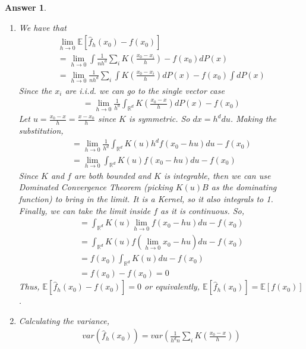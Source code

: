 \documentclass[12pt]{article}
\theoremstyle{colon}
\newtheorem*{answer}{Answer}
\begin{document}
\begin{answer}
  \leavevmode
  \begin{enumerate}[label=\arabic*)]
    \item We have that
      \begin{gather*}
        \lim_{h \rightarrow 0} \mathbb{E}[\widehat{f}_h(x_0) - f(x_0)] \\
        = \lim_{h \rightarrow 0} \int \frac{1}{n h^d} \sum_i K \left( \frac{x_0 - x_i}{h} \right) - f(x_0) dP(x) \\
        = \lim_{h \rightarrow 0} \frac{1}{n h^d} \sum_i \int K \left( \frac{x_0 - x_i}{h} \right) dP(x) - f(x_0) \int dP(x)
      \end{gather*}
      Since the $x_i$ are i.i.d. we can go to the single vector case
      \begin{gather*}
        = \lim_{h \rightarrow 0} \frac{1}{h^d} \int_{\mathbb{R}^d} K \left( \frac{x_0 - x}{h} \right) dP(x) - f(x_0)
      \end{gather*}
      Let $u = \frac{x_0 - x}{h} = \frac{x - x_0}{h}$ since $K$ is symmetric. So $dx = h^d du$. Making the substitution,
      \begin{gather*}
        = \lim_{h \rightarrow 0} \frac{1}{h^d} \int_{\mathbb{R}^d} K(u) h^d f(x_0 - hu) du - f(x_0) \\
        = \lim_{h \rightarrow 0} \int_{\mathbb{R}^d} K(u) f(x_0 - hu) du - f(x_0)
      \end{gather*}
      Since $K$ and $f$ are both bounded and $K$ is integrable, then we can use Dominated Convergence Theorem (picking $K(u)B$ as the dominating function) to bring in the limit. It is a Kernel, so it also integrals to 1. Finally, we can take the limit inside $f$ as it is continuous. So,
      \begin{gather*}
        = \int_{\mathbb{R}^d} K(u) \lim_{h \rightarrow 0} f(x_0 - hu) du - f(x_0) \\
        = \int_{\mathbb{R}^d} K(u) f(\lim_{h \rightarrow 0} x_0 - hu) du - f(x_0) \\
        = f(x_0) \int_{\mathbb{R}^d} K(u) du - f(x_0) \\
        = f(x_0) - f(x_0) = 0
      \end{gather*}
      Thus, $\mathbb{E}[\widehat{f}_h(x_0) - f(x_0)] = 0$ or equivalently, $\mathbb{E}[\widehat{f}_h(x_0)] = \mathbb{E}[f(x_0)]$.
    \item Calculating the variance,
      \begin{gather*}
        var(\widehat{f}_h(x_0)) = var \left(\frac{1}{h^d n} \sum_i K \left( \frac{x_0 - x}{h} \right) \right) \\

\end{gather*}
\end{enumerate}
\end{answer}
\end{document}
